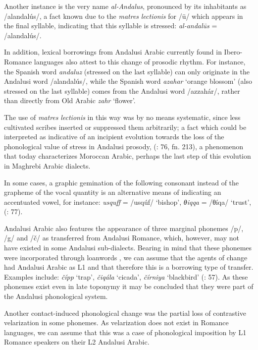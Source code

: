 \documentclass[output=paper,modfonts,nonflat]{langsci/langscibook}
\begin{document}
Another instance is the very name \textit{al-Andalus}, pronounced by its inhabitants as /alandalús/, a fact known due to the \textit{matres} \textit{lectionis} for /ū/ which appears in the final syllable, indicating that this syllable is stressed: {} \textit{al-andalūs} = /alandalús/.

In addition, lexical borrowings from Andalusi Arabic currently found in Ibero-Romance languages also attest to this change of prosodic rhythm. For instance, the Spanish word \textit{andaluz} (stressed on the last syllable) can only originate in the Andalusi word /alandalús/, while the Spanish word \textit{azahar} ‘orange blossom’ (also stressed on the last syllable) comes from the Andalusi word /azzahár/, rather than directly from Old Arabic \textit{zahr} ‘flower’.

The use of \textit{matres} \textit{lectionis} in this way was by no means systematic, since {less cultivated scribes inserted or suppressed them arbitrarily}; a fact which could be interpreted as indicative of an incipient evolution towards the loss of the phonological value of stress in Andalusi prosody, (\citealt{CorrientePereiraVicente2015}: 76, fn. 213), a phenomenon that today characterizes Moroccan Arabic, perhaps the last step of this evolution in Maghrebi Arabic dialects.

{In some cases, a graphic gemination of the following consonant instead of the grapheme of the vocal quantity is an alternative means of indicating an accentuated vowel, for instance: {} \textit{usquff} = /usqúf/ ‘bishop’, {} \textit{θiqqa} = /θíqa/ ‘trust’,} {(\citealt{CorrientePereiraVicente2015}: 77)}{.} 

Andalusi Arabic also features the appearance of three marginal phonemes /p/, /g/ and /č/ as transferred from Andalusi Romance, which, however, may not have existed in some Andalusi sub-dialects. Bearing in mind that these phonemes were incorporated through loanwords \citep{Corriente1978}, we can assume that the agents of change had Andalusi Arabic as L1 and that therefore this is a borrowing type of transfer. Examples include: \textit{čípp} ‘trap’, \textit{čiqála} ‘cicada’, \textit{čírniya} ‘blackbird’ (\citealt{CorrientePereiraVicente2015}: 57). As these phonemes exist even in late toponymy it may be concluded that they were part of the Andalusi phonological system. 

Another contact-induced phonological change was the partial loss of contrastive velarization in some phonemes. As velarization does not exist in Romance languages, we can assume that this was a case of phonological imposition by L1 Romance speakers on their L2 Andalusi Arabic. 
\end{document}
